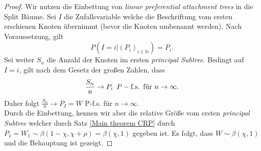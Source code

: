 \begin{proof}
    Wir nutzen die Einbettung von \textit{linear preferential attachment trees} in die Split Bäume. Sei $I$ die Zufallsvariable welche die Beschriftung vom ersten erschienen Knoten übernimmt (bevor die Knoten umbenannt werden). Nach Voraussetzung, gilt 
    \[
    P(I=i|(P_i)_{i \in \mathbb{N}}) = P_i.  
    \] 
    Sei weiter $S_n$ die Anzahl der Knoten im ersten \textit{principal Subtree}. Bedingt auf $I=i$, gilt nach dem Gesetz der großen Zahlen, dass 
    \[
    \frac{S_n}{n} \rightarrow P_i \hspace{5pt} P-\textnormal{f.s.} \hspace{5pt} \textnormal{für } n \to \infty.
    \] 
    Daher folgt $\frac{S_n}{n} \rightarrow P_I = W$ P-f.s. für $n \to \infty$.\\
    Durch die Einbettung, kennen wir aber die relative Größe vom ersten \textit{principal Subtree} welcher durch Satz \ref{Main theorem CRP} durch $P_1 = W_1 \sim \beta(1-\chi,\chi + \rho) = \beta(\chi, 1)$ gegeben ist. Es folgt, dass $W \sim \beta(\chi,1)$ und die Behauptung ist gezeigt.
\end{proof}